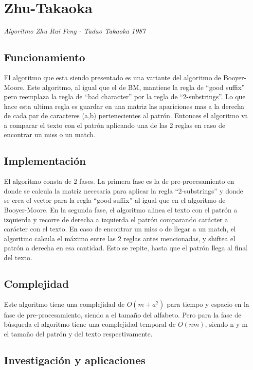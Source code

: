 \documentclass[a4paper, 10pt]{article}
\begin{document}
	\section{Zhu-Takaoka}
		
		\emph{Algoritmo Zhu Rui Feng - Tadao Takaoka 1987}
		
		\subsection{Funcionamiento}
		El algoritmo que esta siendo presentado es una variante del algoritmo de Booyer-Moore. Este 				algoritmo, al igual que el de BM, mantiene la regla de “good suffix” pero reemplaza la regla de 			“bad character” por la regla de “2-substrings”. Lo que hace esta ultima regla es guardar en una 			matriz las apariciones mas a la derecha de cada par de caracteres (a,b) pertenecientes al patrón. 			Entonces el algoritmo va a comparar el texto con el patrón aplicando una de las 2 reglas en caso de 		encontrar un miss o un match.
		
		\subsection{Implementación}
		
		El algoritmo consta de 2 fases. La primera fase es la de pre-procesamiento en donde se calcula la matriz necesaria para aplicar la regla “2-substrings” y donde se crea el vector para la regla “good suffix” al igual que en el algoritmo de Booyer-Moore. En la segunda fase, el algoritmo alinea el texto con el patrón a izquierda y recorre de derecha a izquierda el patrón comparando carácter a carácter con el texto. En caso de encontrar un miss o de llegar a un match, el algoritmo calcula el máximo entre las 2 reglas antes mencionadas, y shiftea el patrón a derecha en esa cantidad. Esto se repite, hasta que el patrón llega al final del texto. 
		
		\subsection{Complejidad}
		
		Este algoritmo tiene una complejidad de $O(m+a^2)$ para tiempo y espacio en la fase de pre-procesamiento, siendo a el tamaño del alfabeto. Pero para la fase de búsqueda el algoritmo tiene una complejidad temporal de $O(nm)$, siendo n y m el tamaño del patrón y del texto respectivamente.
		
		\subsection{Investigación y aplicaciones}
		
\end{document}
